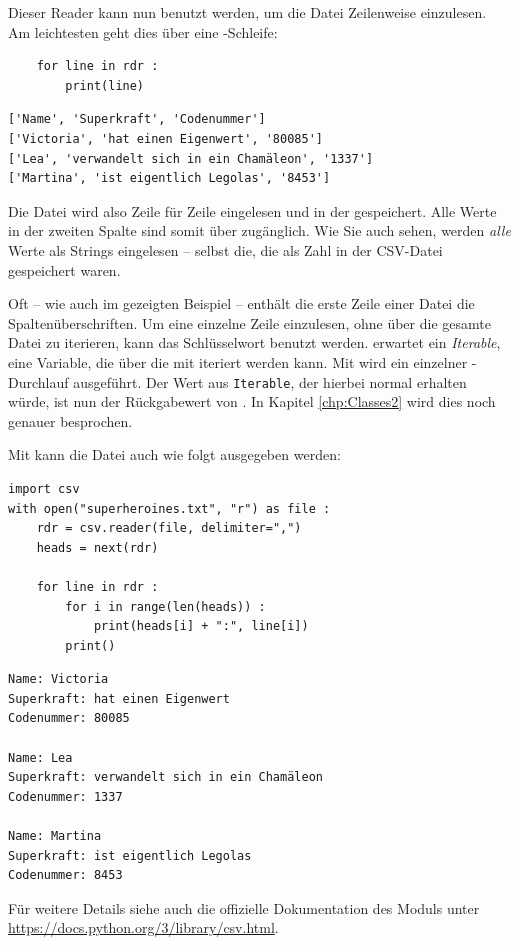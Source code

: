 Dieser Reader kann nun benutzt werden, um die Datei Zeilenweise einzulesen. Am leichtesten geht dies über eine -Schleife:
\begin{codebox}
\begin{verbatim}
    for line in rdr :
        print(line)
\end{verbatim}
\end{codebox}

\begin{cmdbox}
\begin{verbatim}
['Name', 'Superkraft', 'Codenummer']
['Victoria', 'hat einen Eigenwert', '80085']
['Lea', 'verwandelt sich in ein Chamäleon', '1337']
['Martina', 'ist eigentlich Legolas', '8453']
\end{verbatim}
\end{cmdbox}

Die Datei wird also Zeile für Zeile eingelesen und in der  gespeichert. Alle Werte in der zweiten Spalte sind somit \eg über  zugänglich. Wie Sie auch sehen, werden \emph{alle} Werte als Strings eingelesen -- selbst die, die als Zahl in der CSV-Datei gespeichert waren.

Oft -- wie auch im gezeigten Beispiel -- enthält die erste Zeile einer Datei die Spaltenüberschriften. Um eine einzelne Zeile einzulesen, ohne über die gesamte Datei zu iterieren, kann das Schlüsselwort  benutzt werden.  erwartet ein \emph{Iterable}, \ie eine Variable, die über die mit  iteriert werden kann. Mit  wird ein einzelner -Durchlauf ausgeführt. Der Wert aus \texttt{Iterable}, der hierbei normal erhalten würde, ist nun der Rückgabewert von . In Kapitel \ref{chp:Classes2} wird dies noch genauer besprochen.

Mit  kann die Datei auch wie folgt ausgegeben werden:
\begin{codebox}
\begin{verbatim}
import csv
with open("superheroines.txt", "r") as file :
    rdr = csv.reader(file, delimiter=",")
    heads = next(rdr)
    
    for line in rdr :
        for i in range(len(heads)) :
            print(heads[i] + ":", line[i])
        print()
\end{verbatim}
\end{codebox}

\begin{cmdbox}
\begin{verbatim}
Name: Victoria
Superkraft: hat einen Eigenwert
Codenummer: 80085

Name: Lea
Superkraft: verwandelt sich in ein Chamäleon
Codenummer: 1337

Name: Martina
Superkraft: ist eigentlich Legolas
Codenummer: 8453

\end{verbatim}
\end{cmdbox}

Für weitere Details siehe auch die offizielle Dokumentation des Moduls unter \url{https://docs.python.org/3/library/csv.html}.